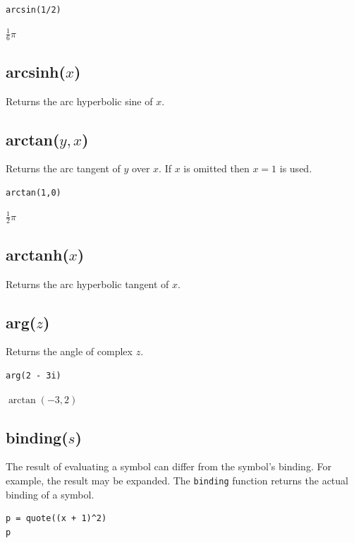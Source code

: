 \documentclass[12pt]{article}
\begin{document}
{\color{blue}
\begin{verbatim}
arcsin(1/2)
\end{verbatim}
}

\noindent
$\tfrac{1}{6}\pi$

\subsection*{arcsinh($x$)}

Returns the arc hyperbolic sine of $x$.

\subsection*{arctan($y,x$)}

Returns the arc tangent of $y$ over $x$.
If $x$ is omitted then $x=1$ is used.

{\color{blue}
\begin{verbatim}
arctan(1,0)
\end{verbatim}
}

\noindent
$\tfrac{1}{2}\pi$

\subsection*{arctanh($x$)}

Returns the arc hyperbolic tangent of $x$.

\subsection*{arg($z$)}

Returns the angle of complex $z$.

{\color{blue}
\begin{verbatim}
arg(2 - 3i)
\end{verbatim}
}

\noindent
$\arctan(-3,2)$

\subsection*{binding($s$)}

The result of evaluating a symbol can differ from the symbol's binding.
For example, the result may be expanded.
The {\tt binding} function returns the actual binding of a symbol.

{\color{blue}
\begin{verbatim}
p = quote((x + 1)^2)
p
\end{verbatim}
}
\end{document}
